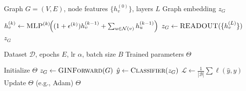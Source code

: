 \begin{algorithm}[t]
\footnotesize
\caption{GIN Forward Pass}
\label{alg:gin_forward}
\begin{algorithmic}[1]
\Require Graph $G=(V,E)$, node features $\{h_v^{(0)}\}$, layers $L$
\Ensure Graph embedding $z_G$

    \State $h_v^{(k)} \gets \textsc{MLP}^{(k)}\!\Big((1+\epsilon^{(k)})h_v^{(k-1)}
    + \sum_{u\in\mathcal{N}(v)} h_u^{(k-1)}\Big)$
  \EndFor
\EndFor
\State $z_G \gets \textsc{READOUT}(\{h_v^{(L)}\})$
\State \Return $z_G$
\end{algorithmic}
\end{algorithm}

\begin{algorithm}[t]
\footnotesize
\caption{Training GIN}
\label{alg:gin_train}
\begin{algorithmic}[1]
\Require Dataset $\mathcal{D}$, epochs $E$, lr $\alpha$, batch size $B$
\Ensure Trained parameters $\Theta$

\State Initialize $\Theta$
      \State $z_G \gets \textsc{GINForward}(G)$
      \State $\hat y \gets \textsc{Classifier}(z_G)$
    \EndFor
    \State $\mathcal{L}\!\gets\!\frac{1}{|\mathcal{B}|}\!\sum\ell(\hat y,y)$
    \State Update $\Theta$ (e.g., Adam)
  \EndFor
\EndFor
\State \Return $\Theta$
\end{algorithmic}
\end{algorithm}
